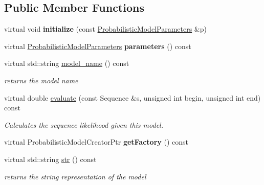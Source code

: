 \subsection*{Public Member Functions}
\begin{DoxyCompactItemize}
\item 
\mbox{\label{classtops_1_1TargetModel_a13f5f8a80fa068f2b82406203b02378d}} 
virtual void {\bfseries initialize} (const \hyperlink{classtops_1_1ProbabilisticModelParameters}{Probabilistic\+Model\+Parameters} \&p)
\item 
\mbox{\label{classtops_1_1TargetModel_afe7e4cca7c7f66cd0039923922c93c21}} 
virtual \hyperlink{classtops_1_1ProbabilisticModelParameters}{Probabilistic\+Model\+Parameters} {\bfseries parameters} () const
\item 
\mbox{\label{classtops_1_1TargetModel_a29c7da66941dec6a7fe4c52fc76a052a}} 
virtual std\+::string \hyperlink{classtops_1_1TargetModel_a29c7da66941dec6a7fe4c52fc76a052a}{model\+\_\+name} () const
\begin{DoxyCompactList}\small\item\em returns the model name \end{DoxyCompactList}\item 
\mbox{\label{classtops_1_1TargetModel_a5e63636c576dfb2f30d3b00115668fdc}} 
virtual double \hyperlink{classtops_1_1TargetModel_a5e63636c576dfb2f30d3b00115668fdc}{evaluate} (const Sequence \&s, unsigned int begin, unsigned int end) const
\begin{DoxyCompactList}\small\item\em Calculates the sequence likelihood given this model. \end{DoxyCompactList}\item 
\mbox{\label{classtops_1_1TargetModel_a96a07bdaabea0c3074eb7bfe9bca667c}} 
virtual Probabilistic\+Model\+Creator\+Ptr {\bfseries get\+Factory} () const
\item 
\mbox{\label{classtops_1_1TargetModel_a9e8aeef278933e1aaf085ec5ece9853d}} 
virtual std\+::string \hyperlink{classtops_1_1TargetModel_a9e8aeef278933e1aaf085ec5ece9853d}{str} () const
\begin{DoxyCompactList}\small\item\em returns the string representation of the model \end{DoxyCompactList}\end{DoxyCompactItemize}


